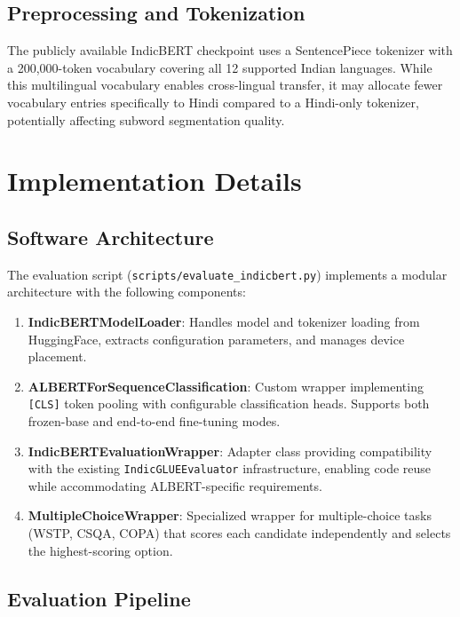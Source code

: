 \subsection{Preprocessing and Tokenization}

The publicly available IndicBERT checkpoint uses a SentencePiece tokenizer with a 200,000-token vocabulary covering all 12 supported Indian languages. While this multilingual vocabulary enables cross-lingual transfer, it may allocate fewer vocabulary entries specifically to Hindi compared to a Hindi-only tokenizer, potentially affecting subword segmentation quality.

\section{Implementation Details}
\label{sec:implementation-details}

\subsection{Software Architecture}

The evaluation script (\texttt{scripts/evaluate\_indicbert.py}) implements a modular architecture with the following components:

\begin{enumerate}
    \item \textbf{IndicBERTModelLoader}: Handles model and tokenizer loading from HuggingFace, extracts configuration parameters, and manages device placement.

    \item \textbf{ALBERTForSequenceClassification}: Custom wrapper implementing \texttt{[CLS]} token pooling with configurable classification heads. Supports both frozen-base and end-to-end fine-tuning modes.

    \item \textbf{IndicBERTEvaluationWrapper}: Adapter class providing compatibility with the existing \texttt{IndicGLUEEvaluator} infrastructure, enabling code reuse while accommodating ALBERT-specific requirements.

    \item \textbf{MultipleChoiceWrapper}: Specialized wrapper for multiple-choice tasks (WSTP, CSQA, COPA) that scores each candidate independently and selects the highest-scoring option.
\end{enumerate}

\subsection{Evaluation Pipeline}

